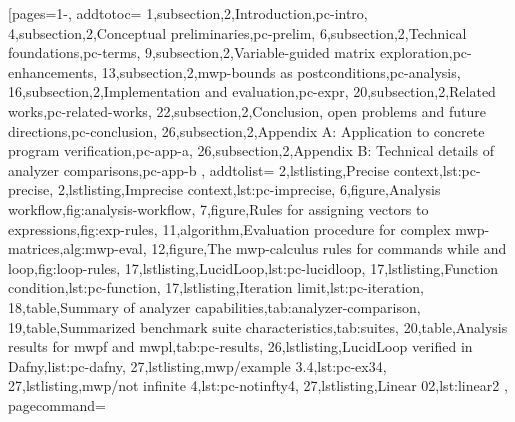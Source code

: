 [pages={1-},
    addtotoc={
        1,subsection,2,{Introduction},pc-intro,
        4,subsection,2,{Conceptual preliminaries},pc-prelim,
        6,subsection,2,{Technical foundations},pc-terms,
        9,subsection,2,{Variable-guided matrix exploration},pc-enhancements,
        13,subsection,2,{mwp-bounds as postconditions},pc-analysis,
        16,subsection,2,{Implementation and evaluation},pc-expr,
        20,subsection,2,{Related works},pc-related-works,
        22,subsection,2,{Conclusion, open problems and future directions},pc-conclusion,
        26,subsection,2,{Appendix A: Application to concrete program verification},pc-app-a,
        26,subsection,2,{Appendix B: Technical details of analyzer comparisons},pc-app-b
    }, addtolist={
        2,lstlisting,{Precise context},lst:pc-precise,
        2,lstlisting,{Imprecise context},lst:pc-imprecise,
        6,figure,{Analysis workflow},fig:analysis-workflow,
        7,figure,{Rules for assigning vectors to expressions},fig:exp-rules,
        11,algorithm,{Evaluation procedure for complex mwp-matrices},alg:mwp-eval,
        12,figure,{The mwp-calculus rules for commands while and loop},fig:loop-rules,
        17,lstlisting,{LucidLoop},lst:pc-lucidloop,
        17,lstlisting,{Function condition},lst:pc-function,
        17,lstlisting,{Iteration limit},lst:pc-iteration,
        18,table,{Summary of analyzer capabilities},tab:analyzer-comparison,
        19,table,{Summarized benchmark suite characteristics},tab:suites,
        20,table,{Analysis results for mwpf and mwpl},tab:pc-results,
        26,lstlisting,{LucidLoop verified in Dafny},list:pc-dafny,
        27,lstlisting,{mwp/example 3.4},lst:pc-ex34,
        27,lstlisting,{mwp/not infinite 4},lst:pc-notinfty4,
        27,lstlisting,{Linear 02},lst:linear2
    }, pagecommand={\thispagestyle{empty}%
}
